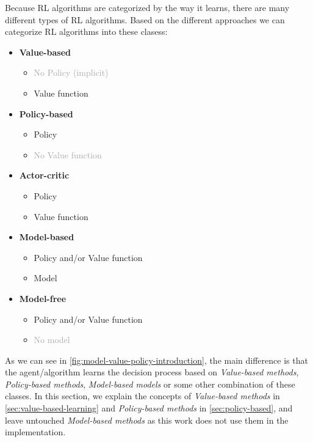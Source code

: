 \documentclass[../xlapes02]{subfiles}
\begin{document}
    Because RL algorithms are categorized by the way it learns, there are many different types of RL algorithms. Based on the different approaches we can categorize RL algorithms into these clasess:
    \begin{multicols}{2}
        \begin{itemize}
            \item \textbf{Value-based}
            \begin{itemize}
                \item \textcolor{darkgray}{No Policy (implicit)}
                \item Value function
            \end{itemize}
            \item \textbf{Policy-based}
            \begin{itemize}
                \item Policy
                \item \textcolor{darkgray}{No Value function}
            \end{itemize}
            \item \textbf{Actor-critic}
            \begin{itemize}
                \item Policy
                \item Value function
            \end{itemize}
        \end{itemize}
        \columnbreak
        \begin{itemize}
            \item \textbf{Model-based}
            \begin{itemize}
                \item Policy and/or Value function
                \item Model
            \end{itemize}
            \item \textbf{Model-free}
            \begin{itemize}
                \item Policy and/or Value function
                \item \textcolor{darkgray}{No model}
            \end{itemize}
        \end{itemize}
    \end{multicols}

    As we can see in \cref{fig:model-value-policy-introduction}, the main difference is that the agent/algorithm learns the decision process based on \emph{Value-based methods}, \emph{Policy-based methods}, \emph{Model-based models} or some other combination of these classes. In this section, we explain the concepts of \emph{Value-based methods} in \cref{sec:value-based-learning} and \emph{Policy-based methods} in \cref{sec:policy-based}, and leave untouched \emph{Model-based methods} as this work does not use them in the implementation.
\end{document}
